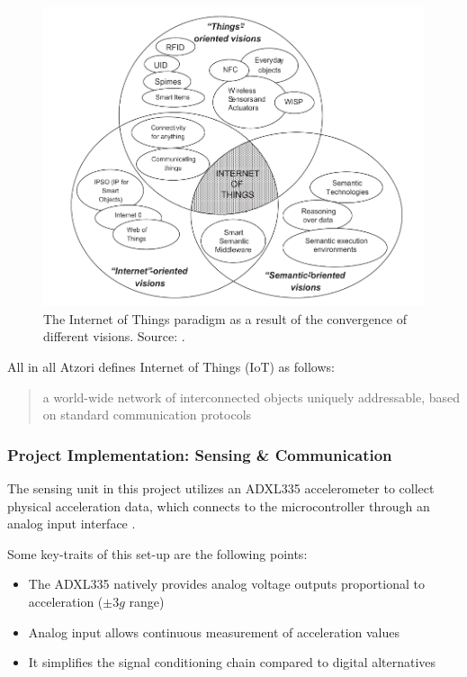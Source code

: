 {{		\begin{figure}[h]
			\centering
			\includegraphics[width=\linewidth]{figures/IoT.png}
			\caption{The Internet of Things paradigm as a result of the convergence of different visions. Source: \cite{Atzori2010}.}
			\label{fig:IoT}
		\end{figure}
			
		All in all Atzori defines Internet of Things (IoT) as follows:
			\begin{quote}
				a world-wide network of interconnected objects uniquely addressable, based on standard communication protocols
			\end{quote}
		}
		
		
		
		
		
		
		
	\subsubsection{Project Implementation: Sensing \& Communication}
	{
		The sensing unit in this project utilizes an ADXL335 accelerometer to collect physical acceleration data, which connects to the microcontroller through an analog input interface \cite{Dharmarathne2025}. 
		
		Some key-traits of this set-up are the following points:
		
		\begin{itemize}
			\item The ADXL335 natively provides analog voltage outputs proportional to acceleration ($\pm3g$ range)
			\item Analog input allows continuous measurement of acceleration values
			\item It simplifies the signal conditioning chain compared to digital alternatives
		\end{itemize}
		
}}
